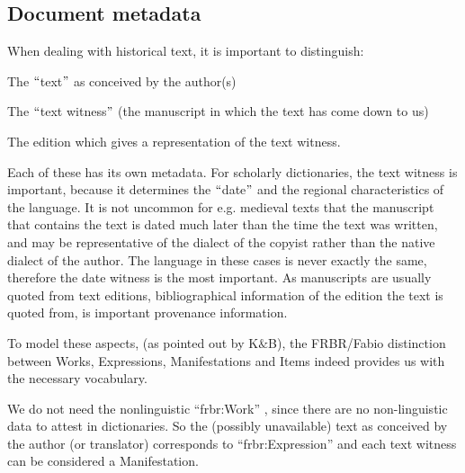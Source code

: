\documentclass[10pt]{article}
\let\tempone\itemize
\let\temptwo\enditemize
\renewenvironment{itemize}{\tempone\setlength\itemsep{-0.5pt}}{\temptwo}
\begin{document}

\subsection{Document metadata }
\label{ssec:witness}

When dealing with historical text, it is important to distinguish:


\begin{itemize}
\item The $``$text$"$ as conceived by the author(s)

\item The $``$text witness$"$  (the manuscript in which the text has come down to us)

\item The edition which gives a representation of the text witness.
\end{itemize}


 Each of these has its own metadata. For scholarly dictionaries, the text witness is important, because it determines the $``$date$"$  and the regional characteristics of the language. It is not uncommon for e.g. medieval texts that the manuscript that contains the text is dated much later than the time the text was written, and may be representative of the dialect of the copyist rather than the native dialect of the author. The language in these cases is never exactly the same, therefore the date witness is the most important. As manuscripts are usually quoted from text editions, bibliographical information of the edition the text is quoted from, is important provenance information.

To model these aspects, (as pointed out by K$\&$B), the FRBR/Fabio distinction between Works, Expressions, Manifestations and Items indeed provides us with the necessary vocabulary.
 
 We do not need the nonlinguistic ``frbr:Work'' , since there are no non-linguistic data to attest in dictionaries. So the (possibly unavailable) text as conceived by the author (or translator) corresponds to ``frbr:Expression'' and each text witness can be  considered a Manifestation.  
 
\end{document}
